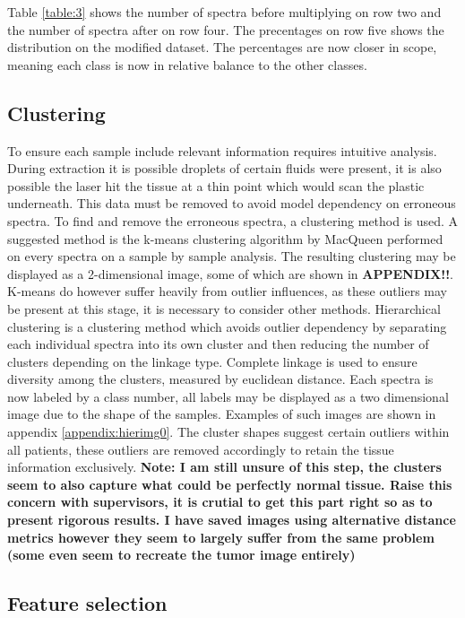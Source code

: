 Table \ref{table:3} shows the number of spectra before multiplying on row two and the number of spectra after on row four. The precentages on row five shows the distribution on the modified dataset. The percentages are now closer in scope,  meaning each class is now in relative balance to the other classes.

\subsection{Clustering}

To ensure each sample include relevant information requires intuitive analysis. During extraction it is possible droplets of certain fluids were present, it is also possible the laser hit the tissue at a thin point which would scan the plastic underneath. This data must be removed to avoid model dependency on erroneous spectra. To find and remove the erroneous spectra, a clustering method is used. A suggested method is the k-means clustering algorithm by MacQueen \cite{macqueen} performed on every spectra on a sample by sample analysis. The resulting clustering may be displayed as a 2-dimensional image, some of which are shown in \textbf{APPENDIX!!}. K-means do however suffer heavily from outlier influences, as these outliers may be present at this stage, it is necessary to consider other methods. Hierarchical clustering is a clustering method which avoids outlier dependency by separating each individual spectra into its own cluster and then reducing the number of clusters depending on the linkage type. Complete linkage is used to ensure diversity among the clusters, measured by euclidean distance\cite{scikit}. Each spectra is now labeled by a class number, all labels may be displayed as a two dimensional image due to the shape of the samples. Examples of such images are shown in appendix \ref{appendix:hierimg0}. The cluster shapes suggest certain outliers within all patients, these outliers are removed accordingly to retain the tissue information exclusively. \textbf{Note: I am still unsure of this step, the clusters seem to also capture what could be perfectly normal tissue. Raise this concern with supervisors, it is crutial to get this part right so as to present rigorous results. I have saved images using alternative distance metrics however they seem to largely suffer from the same problem (some even seem to recreate the tumor image entirely)}

\subsection{Feature selection}

